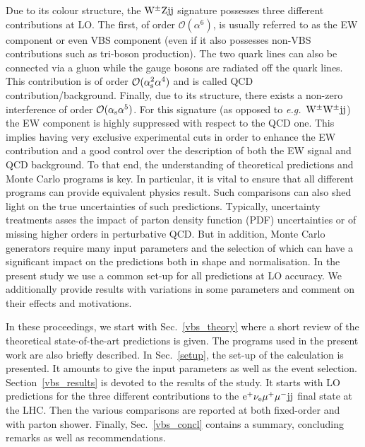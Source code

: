 \documentclass[11pt]{cernrep}
\begin{document}
Due to its colour structure, the ${\rm W}^{\pm}{\rm Z}{\rm j}{\rm j}$ signature possesses three different contributions at LO.
The first, of order $\mathcal{O} (\alpha^6)$, is usually referred to as the EW component or even VBS component (even if it also possesses non-VBS contributions such as tri-boson production).
The two quark lines can also be connected via a gluon while the gauge bosons are radiated off the quark lines.
This contribution is of order $\mathcal{O} (\alpha_{\rm s}^2\alpha^4)$ and is called QCD contribution/background.
Finally, due to its structure, there exists a non-zero interference of order $\mathcal{O} (\alpha_{\rm s}\alpha^5)$.
For this signature (as opposed to \emph{e.g.}\ ${\rm W}^\pm{\rm W}^\pm{\rm j}{\rm j}$) the EW component is highly suppressed with respect to the QCD one.
This implies having very exclusive experimental cuts in order to enhance the EW contribution and a good control over the description of both the EW signal and QCD background.
To that end, the understanding of theoretical predictions and Monte Carlo programs is key.
In particular, it is vital to ensure that all different programs can provide equivalent physics result.
Such comparisons can also shed light on the true uncertainties of such predictions.
Typically, uncertainty treatments asses the impact of parton density function (PDF) uncertainties or of missing higher orders in perturbative QCD.
But in addition, Monte Carlo generators require many input parameters and the selection of which can have a significant impact on the predictions both in shape and normalisation.
In the present study we use a common set-up for all predictions at LO accuracy. We additionally provide results with
variations in some parameters and comment on their effects and motivations.

In these proceedings, we start with Sec.~\ref{vbs_theory} where a short review of the theoretical state-of-the-art predictions is given.
The programs used in the present work are also briefly described.
In Sec.~\ref{setup}, the set-up of the calculation is presented.
It amounts to give the input parameters as well as the event selection.
Section~\ref{vbs_results} is devoted to the results of the study.
It starts with LO predictions for the three different contributions to the ${\rm e}^+  \nu_{\rm e}  \mu^+ \mu^- {\rm j} {\rm j}$ final state at the LHC.
Then the various comparisons are reported at both fixed-order and with parton shower.
Finally, Sec.~\ref{vbs_concl} contains a summary, concluding remarks as well as recommendations.
\end{document}
